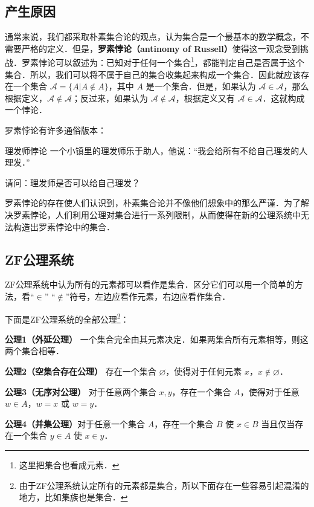 \begin{issues}
\issueDraft
\end{issues}

\subsection{产生原因}
通常来说，我们都采取朴素集合论的观点，认为集合是一个最基本的数学概念，不需要严格的定义．但是，\textbf{罗素悖论（antinomy of Russell）}使得这一观念受到挑战．罗素悖论可以叙述为：已知对于任何一个集合\footnote{这里把集合也看成元素．}，都能判定自己是否属于这个集合．所以，我们可以将不属于自己的集合收集起来构成一个集合．因此就应该存在一个集合 $\mathcal{A}=\{A|A\notin A\}$，其中 $A$ 是一个集合．但是，如果认为 $\mathcal{A}\in\mathcal{A}$，那么根据定义，$\mathcal{A}\notin\mathcal{A}$；反过来，如果认为 $\mathcal{A}\notin\mathcal{A}$，根据定义又有 $\mathcal{A}\in\mathcal{A}$．这就构成一个悖论．

罗素悖论有许多通俗版本：
\begin{example}{理发师悖论}
一个小镇里的理发师乐于助人，他说：“我会给所有不给自己理发的人理发．”

请问：理发师是否可以给自己理发？
\end{example}

罗素悖论的存在使人们认识到，朴素集合论并不像他们想象中的那么严谨．为了解决罗素悖论，人们利用公理对集合进行一系列限制，从而使得在新的公理系统中无法构造出罗素悖论中的集合．

\subsection{ZF公理系统}
ZF公理系统中认为所有的元素都可以看作是集合．区分它们可以用一个简单的方法，看“$\in$” “$\notin$”符号，左边应看作元素，右边应看作集合．

下面是ZF公理系统的全部公理\footnote{由于ZF公理系统认定所有的元素都是集合，所以下面存在一些容易引起混淆的地方，比如集族也是集合．}：

\textbf{公理1（外延公理）} 一个集合完全由其元素决定．如果两集合所有元素相等，则这两个集合相等．

\textbf{公理2（空集合存在公理）} 存在一个集合 $\varnothing$，使得对于任何元素 $x$，$x\notin\varnothing$．

\textbf{公理3（无序对公理）} 对于任意两个集合 $x,y$，存在一个集合 $A$，使得对于任意 $w\in A$，$w=x$ 或 $w=y$．

\textbf{公理4（并集公理）}对于任意一个集合 $A$，存在一个集合 $B$ 使 $x\in B$ 当且仅当存在一个集合 $y\in A$ 使 $x\in y$．

